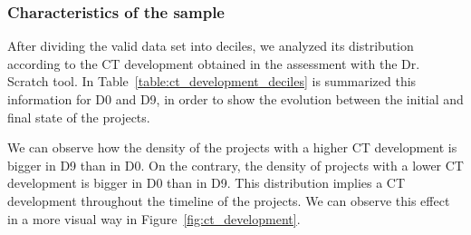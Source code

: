 \subsubsection{Characteristics of the sample}
\label{subsubsec:sample_distribution}

After dividing the valid data set into deciles, we analyzed its distribution according to the CT development obtained in the assessment with the Dr. Scratch tool. In Table~\ref{table:ct_development_deciles} is summarized this information for D0 and D9, in order to show the evolution between the initial and final state of the projects.

We can observe how the density of the projects with a higher CT development is bigger in D9 than in D0. On the contrary, the density of projects with a lower CT development is bigger in D0 than in D9. This distribution implies a CT development throughout the timeline of the projects. We can observe this effect in a more visual way in Figure~\ref{fig:ct_development}. 

